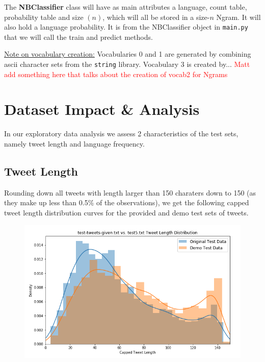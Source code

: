 \documentclass[runningheads]{llncs}
\newcommand{\code}[1]{\texttt{#1}}
\begin{document}
\medskip

The \textbf{NBClassifier} class will have as main attributes a language, count table, probability table and size $(n)$, which will all be stored in a size-$n$ Ngram. It will also hold a language probability. It is from the NBClassifier object in \code{main.py} that we will call the train and predict methods.

\medskip

\underline{Note on vocabulary creation:} Vocabularies 0 and 1 are generated by combining ascii character sets from the \code{string} library. Vocabulary 3 is created by...
\textcolor{red}{Matt add something here that talks about the creation of vocab2 for Ngrams}

\newpage

\section{Dataset Impact \& Analysis}

In our exploratory data analysis we assess 2 characteristics of the test sets, namely tweet length and language frequency.

\subsection{Tweet Length}

Rounding down all tweets with length larger than 150 charaters down to 150 (as they make up less than 0.5\% of the observations), we get the following capped tweet length distribution curves for the provided and demo test sets of tweets.

\begin{figure}
    \begin{center}
        \includegraphics[width=12.5cm]{images/tlendist.png}
    \end{center}
\end{figure}
\end{document}

